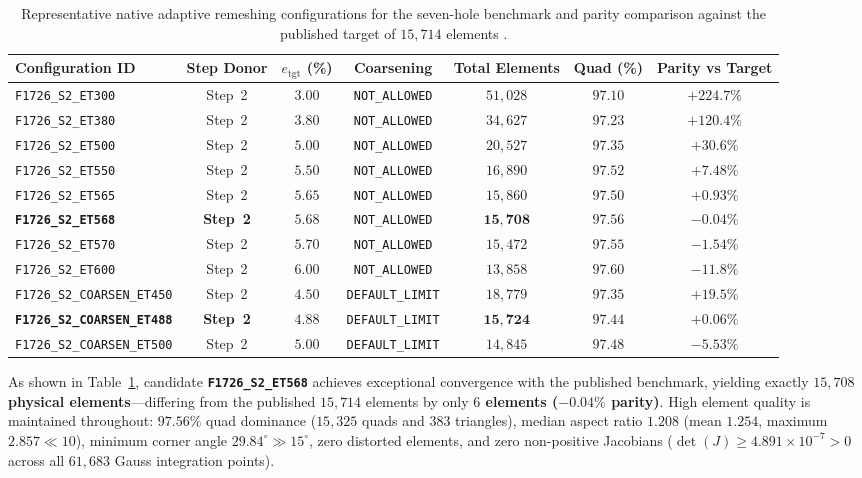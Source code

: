 \begin{table}[htbp]
  \centering
  \small
  \caption{Representative native adaptive remeshing configurations for the seven-hole benchmark and parity comparison against the published target of $15{,}714$ elements \citep{pandey2025}.}
  \label{tab:f1726_remeshing_parity}
  \begin{tabular}{lcccccc}
    \hline
    Configuration ID & Step Donor & $e_{\mathrm{tgt}}$ (\%) & Coarsening & Total Elements & Quad (\%) & Parity vs Target \\
    \hline
    \texttt{F1726\_S2\_ET300} & Step~2 & $3.00$ & \texttt{NOT\_ALLOWED} & $51{,}028$ & $97.10$ & $+224.7\%$ \\
    \texttt{F1726\_S2\_ET380} & Step~2 & $3.80$ & \texttt{NOT\_ALLOWED} & $34{,}627$ & $97.23$ & $+120.4\%$ \\
    \texttt{F1726\_S2\_ET500} & Step~2 & $5.00$ & \texttt{NOT\_ALLOWED} & $20{,}527$ & $97.35$ & $+30.6\%$ \\
    \texttt{F1726\_S2\_ET550} & Step~2 & $5.50$ & \texttt{NOT\_ALLOWED} & $16{,}890$ & $97.52$ & $+7.48\%$ \\
    \texttt{F1726\_S2\_ET565} & Step~2 & $5.65$ & \texttt{NOT\_ALLOWED} & $15{,}860$ & $97.50$ & $+0.93\%$ \\
    \textbf{\texttt{F1726\_S2\_ET568}} & \textbf{Step~2} & $\mathbf{5.68}$ & \texttt{NOT\_ALLOWED} & $\mathbf{15{,}708}$ & $\mathbf{97.56}$ & $\mathbf{-0.04\%}$ \\
    \texttt{F1726\_S2\_ET570} & Step~2 & $5.70$ & \texttt{NOT\_ALLOWED} & $15{,}472$ & $97.55$ & $-1.54\%$ \\
    \texttt{F1726\_S2\_ET600} & Step~2 & $6.00$ & \texttt{NOT\_ALLOWED} & $13{,}858$ & $97.60$ & $-11.8\%$ \\
    \texttt{F1726\_S2\_COARSEN\_ET450} & Step~2 & $4.50$ & \texttt{DEFAULT\_LIMIT} & $18{,}779$ & $97.35$ & $+19.5\%$ \\
    \textbf{\texttt{F1726\_S2\_COARSEN\_ET488}} & \textbf{Step~2} & $\mathbf{4.88}$ & \texttt{DEFAULT\_LIMIT} & $\mathbf{15{,}724}$ & $\mathbf{97.44}$ & $\mathbf{+0.06\%}$ \\
    \texttt{F1726\_S2\_COARSEN\_ET500} & Step~2 & $5.00$ & \texttt{DEFAULT\_LIMIT} & $14{,}845$ & $97.48$ & $-5.53\%$ \\
    \hline
  \end{tabular}
\end{table}

As shown in Table~\ref{tab:f1726_remeshing_parity}, candidate \textbf{\texttt{F1726\_S2\_ET568}} achieves exceptional convergence with the published benchmark, yielding exactly \textbf{$15{,}708$ physical elements}---differing from the published $15{,}714$ elements by only \textbf{$6$ elements ($-0.04\%$ parity)}. High element quality is maintained throughout: $97.56\%$ quad dominance ($15{,}325$ quads and $383$ triangles), median aspect ratio $1.208$ (mean $1.254$, maximum $2.857 \ll 10$), minimum corner angle $29.84^\circ \gg 15^\circ$, zero distorted elements, and zero non-positive Jacobians ($\det(J) \ge 4.891 \times 10^{-7} > 0$ across all $61{,}683$ Gauss integration points).


